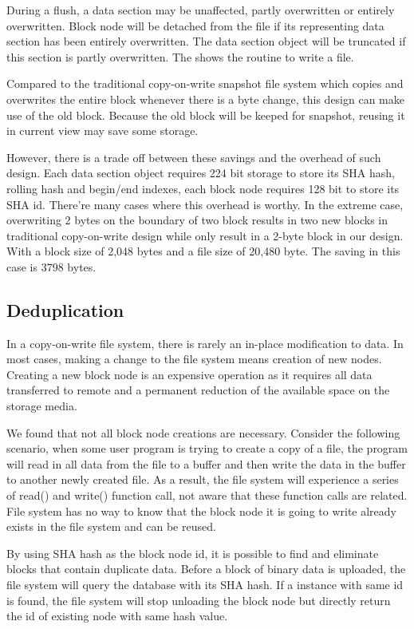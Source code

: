	During a flush, a data section may be unaffected, partly overwritten or entirely overwritten. Block node will be detached from the file if its representing data section has been entirely overwritten. The data section object will be truncated if this section is partly overwritten. The  shows the routine to write a file.

    Compared to the traditional copy-on-write snapshot file system which copies and overwrites the entire block whenever there is a byte change, this design can make use of the old block. Because the old block will be keeped for snapshot, reusing it in current view may save some storage.

    However, there is a trade off between these savings and the overhead of such design. Each data section object requires 224 bit storage to store its SHA hash, rolling hash and begin/end indexes, each block node requires 128 bit to store its SHA id. There're many cases where this overhead is worthy. In the extreme case, overwriting 2 bytes on the boundary of two block results in two new blocks in traditional copy-on-write design while only result in a 2-byte block in our design. With a block size of 2,048 bytes and a file size of 20,480 byte. The saving in this case is 3798 bytes.

\subsection{Deduplication}

    In a copy-on-write file system, there is rarely an in-place modification to data. In most cases, making a change to the file system means creation of new nodes. Creating a new block node is an expensive operation as it requires all data transferred to remote and a permanent reduction of the available space on the storage media.
    
    We found that not all block node creations are necessary. Consider the following scenario, when some user program is trying to create a copy of a file, the program will read in all data from the file to a buffer and then write the data in the buffer to another newly created file. As a result, the file system will experience a series of read() and write() function call, not aware that these function calls are related. File system has no way to know that the block node it is going to write already exists in the file system and can be reused.

    By using SHA hash as the block node id, it is possible to find and eliminate blocks that contain duplicate data. Before a block of binary data is uploaded, the file system will query the database with its SHA hash. If a instance with same id is found, the file system will stop unloading the block node but directly return the id of existing node with same hash value.

